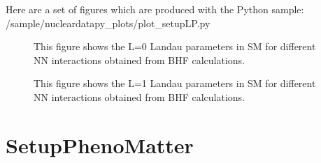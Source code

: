 \documentclass[letterpaper,10pt,english]{sphinxmanual}
\begin{document}
\sphinxAtStartPar
Here are a set of figures which are produced with the Python sample: /sample/nucleardatapy\_plots/plot\_setupLP.py

\begin{figure}[htbp]
\centering
\capstart

\noindent{}
\caption{This figure shows the L=0 Landau parameters in SM for different NN interactions obtained
from BHF calculations.}\label{\detokenize{source/api/setup_micro_LP:id1}}\end{figure}

\begin{figure}[htbp]
\centering
\capstart

\noindent{}
\caption{This figure shows the L=1 Landau parameters in SM for different NN interactions obtained
from BHF calculations.}\label{\detokenize{source/api/setup_micro_LP:id2}}\end{figure}

\sphinxstepscope


\section{SetupPhenoMatter}
\label{\detokenize{source/api/setup_pheno_matter:setupphenomatter}}\label{\detokenize{source/api/setup_pheno_matter::doc}}\label{\detokenize{source/api/setup_pheno_matter:module-nucleardatapy.setup_pheno_matter}}
\end{document}
